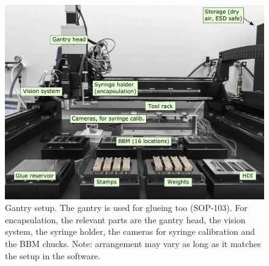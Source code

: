 \documentclass[12pt]{unlsilabsop}
\begin{document}
\begin{figure}[h]
    \begin{center}
        \includegraphics[width=\textwidth]{img/gantryFull16labeled.jpg}
        \caption{Gantry setup. The gantry is used for glueing too (SOP-103). For encapsulation, the relevant parts are the gantry head, the vision system, the syringe holder, the cameras for syringe calibration and the BBM chucks. Note: arrangement may vary as long as it matches the setup in the software.}
        \label{fig:gantryFullLabeled}
    \end{center}
\end{figure}
\end{document}
